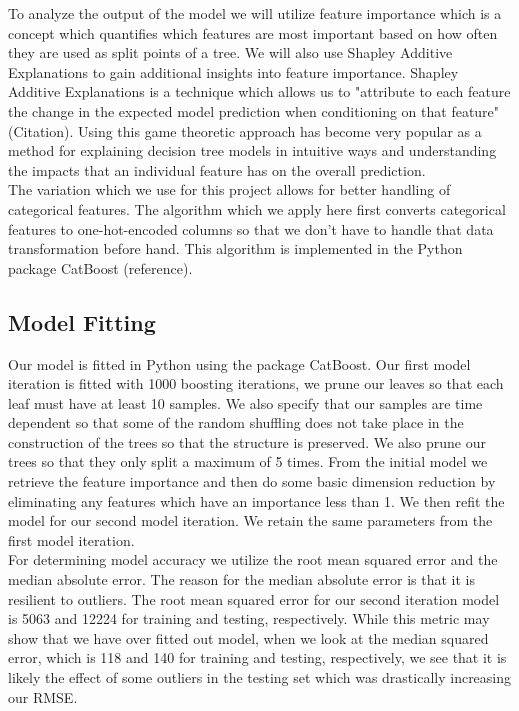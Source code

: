 \documentclass[12pt]{article}
\begin{document}
To analyze the output of the model we will utilize feature importance which is a concept which quantifies which features are most important based on how often they are used as split points of a tree. We will also use Shapley Additive Explanations to gain additional insights into feature importance. Shapley Additive Explanations is a technique which allows us to "attribute to each feature the change in the expected model prediction when conditioning on that feature" (Citation). Using this game theoretic approach has become very popular as a method for explaining decision tree models in intuitive ways and understanding the impacts that an individual feature has on the overall prediction. \\

The variation which we use for this project allows for better handling of categorical features. The algorithm which we apply here first converts categorical features to one-hot-encoded columns so that we don't have to handle that data transformation before hand. This algorithm is implemented in the Python package CatBoost (reference). 

\subsection{\textrm{Model Fitting}}

Our model is fitted in Python using the package CatBoost. Our first model iteration is fitted with 1000 boosting iterations, we prune our leaves so that each leaf must have at least 10 samples. We also specify that our samples are time dependent so that some of the random shuffling does not take place in the construction of the trees so that the structure is preserved. We also prune our trees so that they only split a maximum of 5 times. From the initial model we retrieve the feature importance and then do some basic dimension reduction by eliminating any features which have an importance less than 1. We then refit the model for our second model iteration. We retain the same parameters from the first model iteration. \\

For determining model accuracy we utilize the root mean squared error and the median absolute error. The reason for the median absolute error is that it is resilient to outliers. The root mean squared error for our second iteration model is 5063 and 12224 for training and testing, respectively. While this metric may show that we have over fitted out model, when we look at the median squared error, which is 118 and 140 for training and testing, respectively, we see that it is likely the effect of some outliers in the testing set which was drastically increasing our RMSE. 
\end{document}
